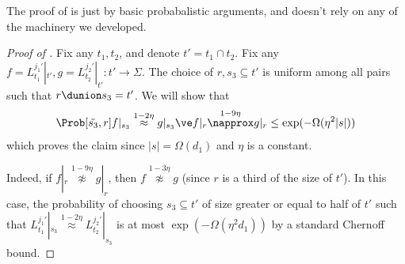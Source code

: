 The proof of  is just by basic probabalistic arguments, and doesn't rely on any of the machinery we developed.
\begin{proof}[Proof of ]
    Fix any \(t_1,t_2\), and denote \(t' = t_1 \cap t_2\). Fix any \(f=L_{t_1}^{j_1'}|_{t'}, g=L_{t_2}^{j_2'}|_{t'}:t' \to \Sigma\). The choice of \(r, s_3 \subseteq t'\) is uniform among all pairs such that \(r \dunion s_3 = t'\). We will show that
    \[\Prob[\tilde{s_3},r]{f|_{s_3} \overset{1-2\eta}{\approx} g|_{s_3} \ve f|_{r} \overset{1-9\eta}{\napprox} g|_{r}} \leq \exp(-\Omega(\eta^2 |s|))\]
    which proves the claim since \(|s| =\Omega(d_1)\) and \(\eta\) is a constant.
    
    Indeed, if \(f|_{r} \overset{1-9\eta}{\napprox} g|_{r}\), then \(f \overset{1-3\eta}{\napprox} g\) (since \(r\) is a third of the size of \(t'\)). In this case, the probability of choosing \(s_3 \subseteq t'\) of size greater or equal to half of \(t'\) such that \(L_{t_1}^{j_1'}|_{s_3} \overset{1-2\eta}{\approx} L_{t_2}^{j_2'}|_{s_3}\) is at most \(\exp(-\Omega(\eta^2 d_1))\) by a standard Chernoff bound.
\end{proof}
